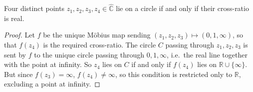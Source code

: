 \begin{corollary}
	Four distinct points \(z_1, z_2, z_3, z_4 \in \hat{\mathbb C}\) lie on a circle if and only if their cross-ratio is real.
\end{corollary}
\begin{proof}
	Let \(f\) be the unique M\"obius map sending \((z_1, z_2, z_3) \mapsto (0, 1, \infty)\), so that \(f(z_4)\) is the required cross-ratio.
	The circle \(C\) passing through \(z_1, z_2, z_3\) is sent by \(f\) to the unique circle passing through \(0, 1, \infty\), i.e.\ the real line together with the point at infinity.
	So \(z_4\) lies on \(C\) if and only if \(f(z_4)\) lies on \(\mathbb R \cup \{ \infty \}\).
	But since \(f(z_3) = \infty\), \(f(z_4) \neq \infty\), so this condition is restricted only to \(\mathbb R\), excluding a point at infinity.
\end{proof}
